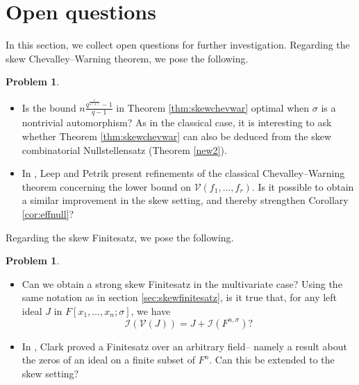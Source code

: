 \documentclass[11pt,reqno]{amsart}
\theoremstyle{definition}
\newtheorem{prob}[thm]{Problem}
\begin{document}
\section{Open questions}
In this section, we collect open questions for further investigation. Regarding the skew Chevalley--Warning theorem, we pose the following.
\begin{prob}
\begin{itemize}
\item Is the bound $n\frac{q^{\frac{1}{o(\sigma)}}-1}{q-1}$ in Theorem \ref{thm:skewchevwar} optimal when $\sigma$ is a nontrivial automorphism? As in the classical case, it is interesting to ask whether Theorem \ref{thm:skewchevwar} can also be deduced from the skew combinatorial Nullstellensatz (Theorem \ref{new2}).
\item In \cite{LP23}, Leep and Petrik present refinements of the classical Chevalley--Warning theorem concerning the lower bound on $\mathscr{V}(f_1,\dots,f_r)$.  Is it possible to obtain a similar improvement in the skew setting, and thereby strengthen Corollary \ref{cor:effnull}?
\end{itemize}
\end{prob}
Regarding the skew Finitesatz, we pose the following.
\begin{prob}
\begin{itemize}
\item Can we obtain a strong skew Finitesatz in the multivariate case? Using the same notation as in section \ref{sec:skewfinitesatz}, is it true that, for any left ideal $J$ in $F[x_1,\dots,x_n;\sigma]$, we have
$$
\mathscr{I}(\mathscr{V}(J))=J+\mathscr{I}(F^{n,\sigma})?
$$
\item In \cite[Theorem 7]{Cla14}, Clark proved a Finitesatz over an arbitrary field-- namely a result about the zeros of an ideal on a finite subset of $F^n$. Can this be extended to the skew setting? 
\end{itemize}
\end{prob}


\end{document}
